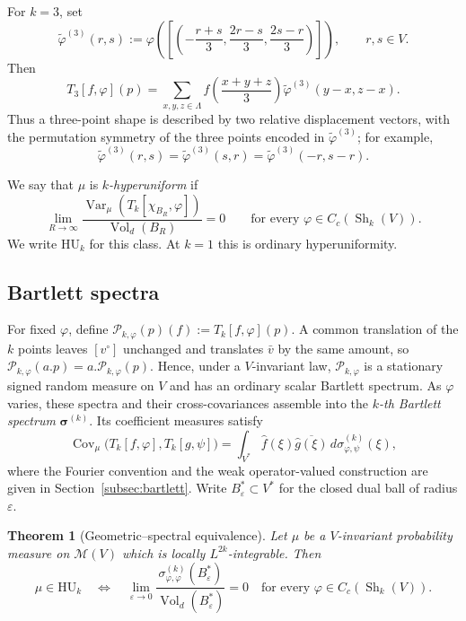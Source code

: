 \documentclass[11pt,reqno,a4paper]{amsart}
\numberwithin{equation}{section}
\theoremstyle{compact}
\newtheorem{maintheorem}{Theorem}
\theoremstyle{definition}
\theoremstyle{definition}
\newcommand{\HU}{\mathrm{HU}}
\newcommand{\Var}{\operatorname{Var}}
\newcommand{\Cov}{\operatorname{Cov}}
\newcommand{\Vol}{\operatorname{Vol}}
\newcommand{\cM}{\mathcal M}
\newcommand{\Sh}{\operatorname{Sh}}
\begin{document}
For $k=3$, set
\[
  \widetilde\varphi^{(3)}(r,s)
  :=\varphi\!\left(
  \left[
  \left(
  -\frac{r+s}{3},
  \frac{2r-s}{3},
  \frac{2s-r}{3}
  \right)
  \right]\right),
  \qquad r,s\in V.
\]
Then
\[
  T_3[f,\varphi](p)
  =\sum_{x,y,z\in\Lambda}
  f\!\left(\frac{x+y+z}{3}\right)
  \widetilde\varphi^{(3)}(y-x,z-x).
\]
Thus a three-point shape is described by two relative displacement vectors,
with the permutation symmetry of the three points encoded in
$\widetilde\varphi^{(3)}$; for example,
\[
  \widetilde\varphi^{(3)}(r,s)
  =\widetilde\varphi^{(3)}(s,r)
  =\widetilde\varphi^{(3)}(-r,s-r).
\]

We say that $\mu$ is \emph{$k$-hyperuniform} if
\begin{equation}\label{eq:intro-huk}
  \lim_{R\to\infty}
  \frac{\Var_\mu(T_k[\chi_{B_R},\varphi])}{\Vol_d(B_R)}=0
  \qquad\text{for every }\varphi\in C_c(\Sh_k(V)).
\end{equation}
We write $\HU_k$ for this class.  At $k=1$ this is ordinary
hyperuniformity.

\subsection{Bartlett spectra}
\label{subsec:intro-bartlett}

For fixed $\varphi$, define
$\mathcal P_{k,\varphi}(p)(f):=T_k[f,\varphi](p)$.  A common translation of
the $k$ points leaves $[v^\circ]$ unchanged and translates $\bar v$ by the
same amount, so
$\mathcal P_{k,\varphi}(a.p)=a.\mathcal P_{k,\varphi}(p)$.  Hence, under a
$V$-invariant law, $\mathcal P_{k,\varphi}$ is a stationary signed random
measure on $V$ and has an ordinary scalar Bartlett spectrum.  As $\varphi$
varies, these spectra and their cross-covariances assemble into the
\emph{$k$-th Bartlett spectrum} $\boldsymbol{\sigma}^{(k)}$.  Its coefficient
measures satisfy
\begin{equation}\label{eq:intro-bartlett}
  \Cov_\mu\bigl(T_k[f,\varphi],T_k[g,\psi]\bigr)
  =\int_{V^*}\widehat f(\xi)\overline{\widehat g(\xi)}\,
    d\sigma^{(k)}_{\varphi,\psi}(\xi),
\end{equation}
where the Fourier convention and the weak operator-valued construction are given
in Section~\ref{subsec:bartlett}.  Write $B_\varepsilon^*\subset V^*$ for the
closed dual ball of radius $\varepsilon$.

\begin{maintheorem}[Geometric--spectral equivalence]
\label{thm:intro-geometric-spectral}
Let $\mu$ be a $V$-invariant probability measure on $\cM(V)$ which is locally
$L^{2k}$-integrable.  Then
\begin{equation}\label{eq:intro-geometric-spectral}
  \mu\in\HU_k
  \quad\Longleftrightarrow\quad
  \lim_{\varepsilon\to0}
  \frac{\sigma^{(k)}_{\varphi,\varphi}(B_\varepsilon^*)}
       {\Vol_d(B_\varepsilon^*)}=0
  \quad\text{for every }\varphi\in C_c(\Sh_k(V)).
\end{equation}
\end{maintheorem}
\end{document}
